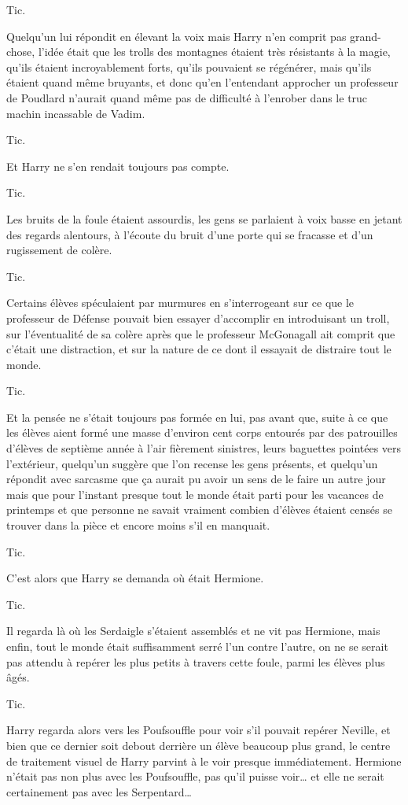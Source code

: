 Tic.

Quelqu'un lui répondit en élevant la voix mais Harry n'en comprit pas grand-chose, l'idée était que les trolls des montagnes étaient très résistants à la magie, qu'ils étaient incroyablement forts, qu'ils pouvaient se régénérer, mais qu'ils étaient quand même bruyants, et donc qu'en l'entendant approcher un professeur de Poudlard n'aurait quand même pas de difficulté à l'enrober dans le truc machin incassable de Vadim.

Tic.

Et Harry ne s'en rendait toujours pas compte.

Tic.

Les bruits de la foule étaient assourdis, les gens se parlaient à voix basse en jetant des regards alentours, à l'écoute du bruit d'une porte qui se fracasse et d'un rugissement de colère.

Tic.

Certains élèves spéculaient par murmures en s'interrogeant sur ce que le professeur de Défense pouvait bien essayer d'accomplir en introduisant un troll, sur l'éventualité de sa colère après que le professeur McGonagall ait comprit que c'était une distraction, et sur la nature de ce dont il essayait de distraire tout le monde.

Tic.

Et la pensée ne s'était toujours pas formée en lui, pas avant que, suite à ce que les élèves aient formé une masse d'environ cent corps entourés par des patrouilles d'élèves de septième année à l'air fièrement sinistres, leurs baguettes pointées vers l'extérieur, quelqu'un suggère que l'on recense les gens présents, et quelqu'un répondit avec sarcasme que ça aurait pu avoir un sens de le faire un autre jour mais que pour l'instant presque tout le monde était parti pour les vacances de printemps et que personne ne savait vraiment combien d'élèves étaient censés se trouver dans la pièce et encore moins s'il en manquait.

Tic.

C'est alors que Harry se demanda où était Hermione.

Tic.

Il regarda là où les Serdaigle s'étaient assemblés et ne vit pas Hermione, mais enfin, tout le monde était suffisamment serré l'un contre l'autre, on ne se serait pas attendu à repérer les plus petits à travers cette foule, parmi les élèves plus âgés.

Tic.

Harry regarda alors vers les Poufsouffle pour voir s'il pouvait repérer Neville, et bien que ce dernier soit debout derrière un élève beaucoup plus grand, le centre de traitement visuel de Harry parvint à le voir presque immédiatement. Hermione n'était pas non plus avec les Poufsouffle, pas qu'il puisse voir… et elle ne serait certainement pas avec les Serpentard…

